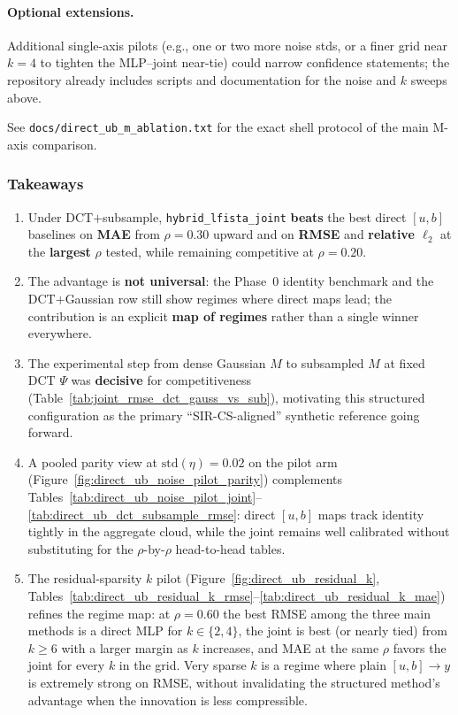 \paragraph{Optional extensions.}
Additional single-axis pilots (e.g., one or two more noise stds, or a finer grid near $k=4$ to tighten the MLP--joint near-tie) could narrow confidence statements; the repository already includes scripts and documentation for the noise and $k$ sweeps above.

See \texttt{docs/direct\_ub\_m\_ablation.txt} for the exact shell protocol of the main M-axis comparison.

\subsubsection*{Takeaways}
\begin{enumerate}
  \item Under DCT$+$subsample, \texttt{hybrid\_lfista\_joint} \textbf{beats} the best direct $[u,b]$ baselines on \textbf{MAE} from $\rho=0.30$ upward and on \textbf{RMSE} and \textbf{relative $\ell_2$} at the \textbf{largest} $\rho$ tested, while remaining competitive at $\rho=0.20$.
  \item The advantage is \textbf{not universal}: the Phase~0 identity benchmark and the DCT$+$Gaussian row still show regimes where direct maps lead; the contribution is an explicit \textbf{map of regimes} rather than a single winner everywhere.
  \item The experimental step from dense Gaussian $M$ to subsampled $M$ at fixed DCT $\Psi$ was \textbf{decisive} for competitiveness (Table~\ref{tab:joint_rmse_dct_gauss_vs_sub}), motivating this structured configuration as the primary ``SIR-CS-aligned'' synthetic reference going forward.
  \item A pooled parity view at $\mathrm{std}(\eta)=0.02$ on the pilot arm (Figure~\ref{fig:direct_ub_noise_pilot_parity}) complements Tables~\ref{tab:direct_ub_noise_pilot_joint}--\ref{tab:direct_ub_dct_subsample_rmse}: direct $[u,b]$ maps track identity tightly in the aggregate cloud, while the joint remains well calibrated without substituting for the $\rho$-by-$\rho$ head-to-head tables.
  \item The residual-sparsity $k$ pilot (Figure~\ref{fig:direct_ub_residual_k}, Tables~\ref{tab:direct_ub_residual_k_rmse}--\ref{tab:direct_ub_residual_k_mae}) refines the regime map: at $\rho=0.60$ the best RMSE among the three main methods is a direct MLP for $k\in\{2,4\}$, the joint is best (or nearly tied) from $k\ge 6$ with a larger margin as $k$ increases, and MAE at the same $\rho$ favors the joint for every $k$ in the grid. Very sparse $k$ is a regime where plain $[u,b]\to y$ is extremely strong on RMSE, without invalidating the structured method's advantage when the innovation is less compressible.
\end{enumerate}
